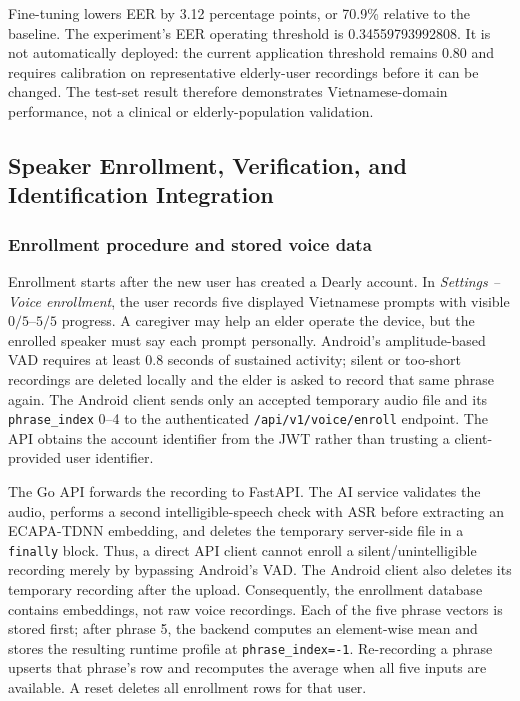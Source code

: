 Fine-tuning lowers EER by 3.12 percentage points, or 70.9\% relative to the baseline. The experiment's EER operating threshold is 0.34559793992808. It is not automatically deployed: the current application threshold remains 0.80 and requires calibration on representative elderly-user recordings before it can be changed. The test-set result therefore demonstrates Vietnamese-domain performance, not a clinical or elderly-population validation.

\subsection{Speaker Enrollment, Verification, and Identification Integration}
\subsubsection{Enrollment procedure and stored voice data}
Enrollment starts after the new user has created a Dearly account. In \emph{Settings -- Voice enrollment}, the user records five displayed Vietnamese prompts with visible $0/5$--$5/5$ progress. A caregiver may help an elder operate the device, but the enrolled speaker must say each prompt personally. Android's amplitude-based VAD requires at least 0.8 seconds of sustained activity; silent or too-short recordings are deleted locally and the elder is asked to record that same phrase again. The Android client sends only an accepted temporary audio file and its \texttt{phrase\_index} 0--4 to the authenticated \texttt{/api/v1/voice/enroll} endpoint. The API obtains the account identifier from the JWT rather than trusting a client-provided user identifier.

The Go API forwards the recording to FastAPI. The AI service validates the audio, performs a second intelligible-speech check with ASR before extracting an ECAPA-TDNN embedding, and deletes the temporary server-side file in a \texttt{finally} block. Thus, a direct API client cannot enroll a silent/unintelligible recording merely by bypassing Android's VAD. The Android client also deletes its temporary recording after the upload. Consequently, the enrollment database contains embeddings, not raw voice recordings. Each of the five phrase vectors is stored first; after phrase 5, the backend computes an element-wise mean and stores the resulting runtime profile at \texttt{phrase\_index=-1}. Re-recording a phrase upserts that phrase's row and recomputes the average when all five inputs are available. A reset deletes all enrollment rows for that user.


